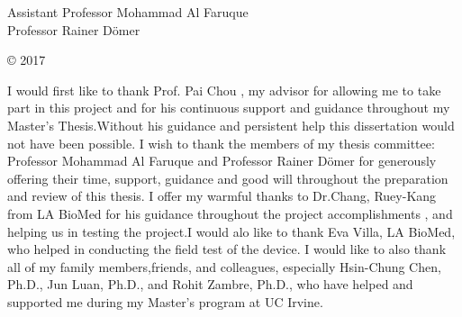 



\othercommitteemembers
{
  Assistant Professor Mohammad Al Faruque\\
  Professor Rainer D{\"o}mer
}


\copyrightdeclaration
{
  {\copyright} {2017} \Authorname
}


  

\acknowledgments
{
  I would first like to thank Prof. Pai Chou , my advisor for allowing me to take part in this project and for his continuous support and guidance throughout my Master's Thesis.Without his guidance and persistent help this dissertation would not have been possible. I wish to thank the members of my thesis committee: Professor Mohammad Al Faruque and Professor Rainer D{\"o}mer for generously
  offering their time, support, guidance and good will throughout the
  preparation and review of this thesis. I offer my warmful thanks to Dr.Chang, Ruey-Kang from LA BioMed for his guidance throughout the project accomplishments , and helping us in testing the project.I would alo like to thank Eva Villa, LA BioMed, who helped in conducting the field test of the device. I would like to also thank all of my family members,friends, and colleagues, especially  Hsin-Chung Chen, Ph.D., Jun Luan, Ph.D., and Rohit Zambre, Ph.D.,
  who have helped and supported me during my Master's program at UC Irvine.   
}


